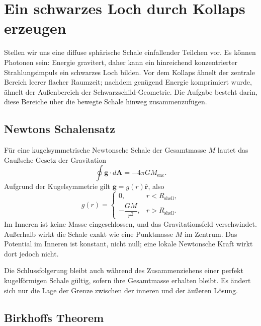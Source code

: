\section{Ein schwarzes Loch durch Kollaps erzeugen}

Stellen wir uns eine diffuse sphärische Schale einfallender Teilchen vor. Es können Photonen sein: Energie gravitert, daher kann ein hinreichend konzentrierter Strahlungsimpuls ein schwarzes Loch bilden. Vor dem Kollaps ähnelt der zentrale Bereich leerer flacher Raumzeit; nachdem genügend Energie komprimiert wurde, ähnelt der Außenbereich der Schwarzschild-Geometrie. Die Aufgabe besteht darin, diese Bereiche über die bewegte Schale hinweg zusammenzufügen.

\subsection{Newtons Schalensatz}

Für eine kugelsymmetrische Newtonsche Schale der Gesamtmasse \(M\) lautet das Gaußsche Gesetz der Gravitation
\begin{equation}
\oint \mathbf{g}\cdot d\mathbf{A}=-4\pi G M_{\mathrm{enc}}.
\label{eq:l04-gauss-gravity}
\end{equation}
Aufgrund der Kugelsymmetrie gilt \(\mathbf{g}=g(r)\hat{\mathbf r}\), also
\begin{equation}
g(r)=
\begin{cases}
0, & r<R_{\mathrm{shell}},\\[4pt]
-\dfrac{GM}{r^2}, & r>R_{\mathrm{shell}}.
\end{cases}
\label{eq:l04-shell-field}
\end{equation}
Im Inneren ist keine Masse eingeschlossen, und das Gravitationsfeld verschwindet. Außerhalb wirkt die Schale exakt wie eine Punktmasse \(M\) im Zentrum. Das Potential im Inneren ist konstant, nicht null; eine lokale Newtonsche Kraft wirkt dort jedoch nicht.

Die Schlussfolgerung bleibt auch während des Zusammenziehens einer perfekt kugelförmigen Schale gültig, sofern ihre Gesamtmasse erhalten bleibt. Es ändert sich nur die Lage der Grenze zwischen der inneren und der äußeren Lösung.

\subsection{Birkhoffs Theorem}

